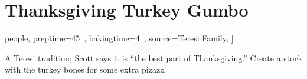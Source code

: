 \section[Turkey Gumbo]{Thanksgiving Turkey Gumbo}

\begin{recipestats}[
        servings=[4 \ldots 6] people,
        preptime=45~\minute,
        bakingtime=4~\hour,
        source=Teresi Family,
    ]
\end{recipestats}

\begin{recipeabstract}
    A Teresi tradition; Scott says it is ``the best part of Thanksgiving.''
    Create a stock with the turkey bones for some extra pizazz.
\end{recipeabstract}

\begin{ingredientcolumns}
    \begin{ingredientblock}
        \\
        \\
        \\
        \\
        \\
        \\
        \\
        \\
    \end{ingredientblock}
    \begin{ingredientblock}
        \\
        \\
        \\
        \\
        \\
        \\
    \end{ingredientblock}
\end{ingredientcolumns}


